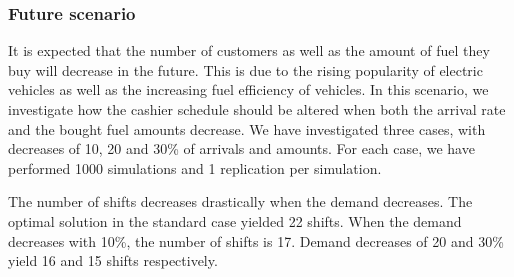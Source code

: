\subsubsection{Future scenario}
It is expected that the number of customers as well as the amount of fuel they buy will decrease in the future.
This is due to the rising popularity of electric vehicles as well as the increasing fuel efficiency of vehicles.
In this scenario, we investigate how the cashier schedule should be altered when both the arrival rate and the bought fuel amounts decrease.
We have investigated three cases, with decreases of 10, 20 and 30\% of arrivals and amounts.
For each case, we have performed 1000 simulations and 1 replication per simulation.

The number of shifts decreases drastically when the demand decreases.
The optimal solution in the standard case yielded 22 shifts.
When the demand decreases with 10\%, the number of shifts is 17.
Demand decreases of 20 and 30\% yield 16 and 15 shifts respectively.